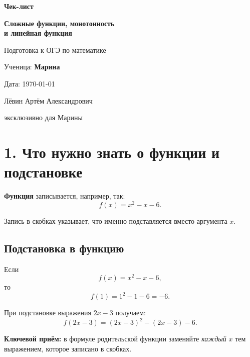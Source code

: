 \documentclass[a4paper,12pt]{article}
\newcommand{\sect}[1]{\section*{\textcolor{darkaccent}{#1}}}
\newcommand{\subsect}[1]{\subsection*{\textcolor{accent}{#1}}}
\newcommand{\key}[1]{\textbf{\textcolor{darkaccent}{#1}}}
\begin{document}
\begin{titlepage}
\thispagestyle{empty}
\centering
\vspace*{28mm}

{\Large\textcolor{darkaccent}{\textbf{Чек-лист}}\par}
\vspace{6mm}

{\LARGE\textbf{Сложные функции, монотонность}\\[2mm]
\textbf{и линейная функция}\par}

\vspace{8mm}
{\large Подготовка к ОГЭ по математике\par}

\vspace{20mm}
{\large Ученица: \textbf{Марина}\par}

\vspace{4mm}
{\large Дата: \today\par}

\vfill

{\large Лёвин Артём Александрович\par}
{\normalsize эксклюзивно для Марины\par}

\vspace{18mm}


\end{titlepage}

\sect{1. Что нужно знать о функции и подстановке}

\key{Функция} записывается, например, так:
\[
f(x)=x^2-x-6.
\]

Запись в скобках указывает, что именно подставляется вместо аргумента $x$.

\subsect{Подстановка в функцию}

Если
\[
f(x)=x^2-x-6,
\]
то
\[
f(1)=1^2-1-6=-6.
\]

При подстановке выражения $2x-3$ получаем:
\[
f(2x-3)=(2x-3)^2-(2x-3)-6.
\]

\key{Ключевой приём:} в формуле родительской функции заменяйте
\emph{каждый} $x$ тем выражением, которое записано в скобках.
\end{document}
